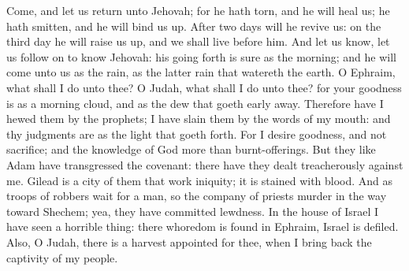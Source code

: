 Come, and let us return unto Jehovah; for he hath torn, and he will heal us; he hath smitten, and he will bind us up. After two days will he revive us: on the third day he will raise us up, and we shall live before him. And let us know, let us follow on to know Jehovah: his going forth is sure as the morning; and he will come unto us as the rain, as the latter rain that watereth the earth.  O Ephraim, what shall I do unto thee? O Judah, what shall I do unto thee? for your goodness is as a morning cloud, and as the dew that goeth early away. Therefore have I hewed them by the prophets; I have slain them by the words of my mouth: and thy judgments are as the light that goeth forth. For I desire goodness, and not sacrifice; and the knowledge of God more than burnt-offerings. But they like Adam have transgressed the covenant: there have they dealt treacherously against me. Gilead is a city of them that work iniquity; it is stained with blood. And as troops of robbers wait for a man, so the company of priests murder in the way toward Shechem; yea, they have committed lewdness. In the house of Israel I have seen a horrible thing: there whoredom is found in Ephraim, Israel is defiled. Also, O Judah, there is a harvest appointed for thee, when I bring back the captivity of my people. 

